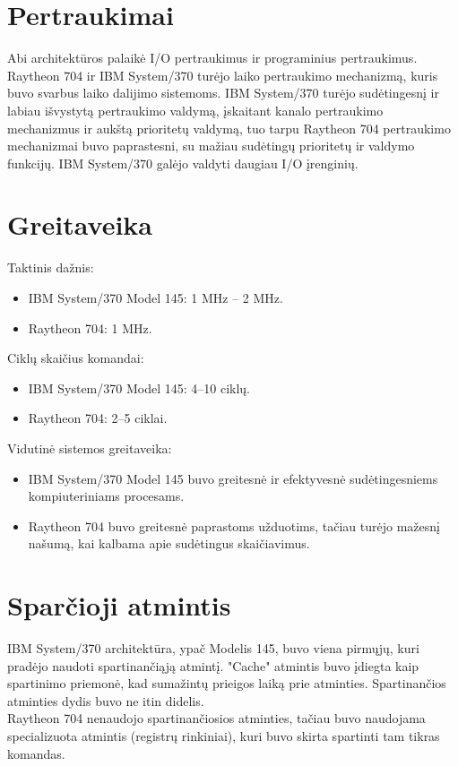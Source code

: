 \documentclass{article}
\begin{document}
\section*{Pertraukimai}
Abi architektūros palaikė I/O pertraukimus ir programinius pertraukimus. Raytheon 704 ir IBM System/370 turėjo laiko pertraukimo mechanizmą, kuris buvo svarbus laiko dalijimo sistemoms.
IBM System/370 turėjo sudėtingesnį ir labiau išvystytą pertraukimo valdymą, įskaitant kanalo pertraukimo mechanizmus ir aukštą prioritetų valdymą, tuo tarpu Raytheon 704 pertraukimo mechanizmai buvo paprastesni, su mažiau sudėtingų prioritetų ir valdymo funkcijų.
IBM System/370 galėjo valdyti daugiau I/O įrenginių.
\section*{Greitaveika}
Taktinis dažnis:
\begin{itemize}
    \item IBM System/370 Model 145: 1 MHz – 2 MHz.
    \item Raytheon 704: 1 MHz.
\end{itemize}
Ciklų skaičius komandai:
\begin{itemize}
    \item IBM System/370 Model 145: 4–10 ciklų.
    \item Raytheon 704: 2–5 ciklai.
\end{itemize}
Vidutinė sistemos greitaveika:
\begin{itemize}
    \item IBM System/370 Model 145 buvo greitesnė ir efektyvesnė sudėtingesniems kompiuteriniams procesams.
    \item Raytheon 704 buvo greitesnė paprastoms užduotims, tačiau turėjo mažesnį našumą, kai kalbama apie sudėtingus skaičiavimus.
\end{itemize}
\section*{Sparčioji atmintis}
IBM System/370 architektūra, ypač Modelis 145, buvo viena pirmųjų, kuri pradėjo naudoti spartinančiąją atmintį. "Cache" atmintis buvo įdiegta kaip spartinimo priemonė, kad sumažintų prieigos laiką prie atminties. Spartinančios atminties dydis buvo ne itin didelis.
\\
Raytheon 704 nenaudojo spartinančiosios atminties, tačiau buvo naudojama specializuota atmintis (registrų rinkiniai), kuri buvo skirta spartinti tam tikras komandas.
\end{document}

